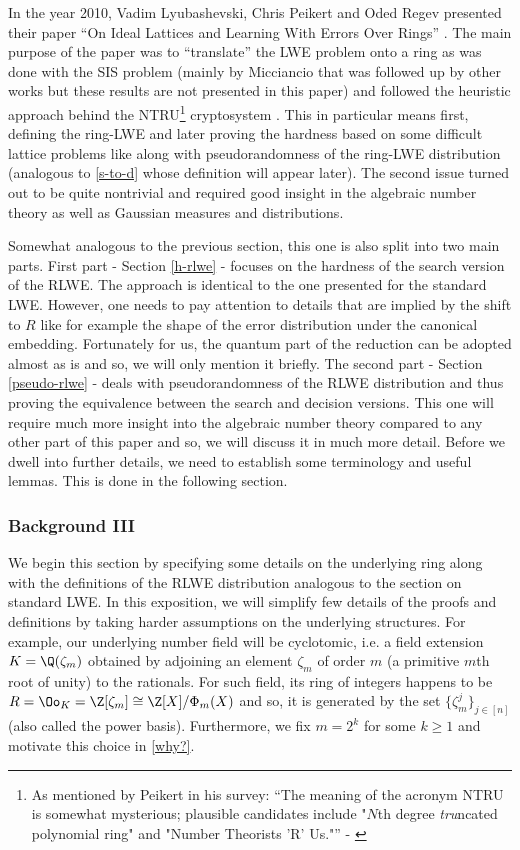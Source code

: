 In the year 2010, Vadim Lyubashevski, Chris Peikert and Oded Regev presented their paper ``On Ideal Lattices and Learning With Errors Over Rings'' \cite{ring-lwe}. The main purpose of the paper was to ``translate'' the LWE problem onto a ring as was done with the SIS problem (mainly by Micciancio \cite{ring-sis} that was followed up by other works but these results are not presented in this paper) and followed the heuristic approach behind the NTRU\footnote{As mentioned by Peikert in his survey: ``The meaning of the acronym NTRU is somewhat mysterious; plausible candidates include "$N$th degree \textit{tru}ncated polynomial ring" and "Number Theorists ’R’ Us."'' - \cite{lattice-survey}} cryptosystem \cite{ntru}. This in particular means first, defining the ring-LWE and later proving the hardness based on some difficult lattice problems like  along with pseudorandomness of the ring-LWE distribution (analogous to \ref{s-to-d} whose definition will appear later). The second issue turned out to be quite nontrivial and required good insight in the algebraic number theory as well as Gaussian measures and distributions.

Somewhat analogous to the previous section, this one is also split into two main parts. First part - Section \ref{h-rlwe} - focuses on the hardness of the search version of the RLWE. The approach is identical to the one presented for the standard LWE. However, one needs to pay attention to details that are implied by the shift to $R$ like for example the shape of the error distribution under the canonical embedding. Fortunately for us, the quantum part of the reduction can be adopted almost as is and so, we will only mention it briefly. The second part - Section \ref{pseudo-rlwe} - deals with pseudorandomness of the RLWE distribution and thus proving the equivalence between the search and decision versions. This one will require much more insight into the algebraic number theory compared to any other part of this paper and so, we will discuss it in much more detail. Before we dwell into further details, we need to establish some terminology and useful lemmas. This is done in the following section.

\subsubsection{Background III}
We begin this section by specifying some details on the underlying ring along with the definitions of the RLWE distribution analogous to the section on standard LWE. In this exposition, we will simplify few details of the proofs and definitions by taking harder assumptions on the underlying structures. For example, our underlying number field will be cyclotomic, i.e. a field extension $K=\Q(\zeta_m)$ obtained by adjoining an element $\zeta_m$ of order $m$ (a primitive $m$th root of unity) to the rationals. For such field, its ring of integers happens to be $R = \Oo_K = \Z[\zeta_m] \cong \Z[X]/\Phi_m(X)$ and so, it is generated by the set $\{\zeta_m^j\}_{j \in [n]}$ (also called the power basis). Furthermore, we fix $m = 2^k$ for some $k \geq 1$ and motivate this choice in \ref{why?}.

